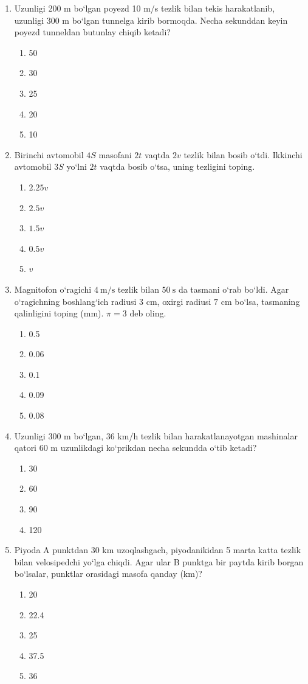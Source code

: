 \begin{enumerate}
\item Uzunligi 200 m bo‘lgan poyezd 10 m/s tezlik bilan tekis harakatlanib, uzunligi 300 m bo‘lgan tunnelga kirib bormoqda. 
Necha sekunddan keyin poyezd tunneldan butunlay chiqib ketadi?
\begin{enumerate}[label=\Alph*)]
\item 50
\item 30
\item 25
\item 20
\item 10
\end{enumerate}

\item Birinchi avtomobil $4S$ masofani $2t$ vaqtda $2v$ tezlik bilan bosib o‘tdi. 
Ikkinchi avtomobil $3S$ yo‘lni $2t$ vaqtda bosib o‘tsa, uning tezligini toping.
\begin{enumerate}[label=\Alph*)]
\item $2.25v$
\item $2.5v$
\item $1.5v$
\item $0.5v$
\item $v$
\end{enumerate}

\item Magnitofon o‘ragichi $4\ \text{m/s}$ tezlik bilan $50\ \text{s}$ da tasmani o‘rab bo‘ldi. 
Agar o‘ragichning boshlang‘ich radiusi $3$ cm, oxirgi radiusi $7$ cm bo‘lsa, tasmaning qalinligini toping (mm). 
$\pi=3$ deb oling.
\begin{enumerate}[label=\Alph*)]
\item 0.5
\item 0.06
\item 0.1
\item 0.09
\item 0.08
\end{enumerate}

\item Uzunligi 300 m bo‘lgan, 36 km/h tezlik bilan harakatlanayotgan mashinalar qatori 60 m uzunlikdagi ko‘prikdan necha sekundda o‘tib ketadi?
\begin{enumerate}[label=\Alph*)]
\item 30
\item 60
\item 90
\item 120
\end{enumerate}

\item Piyoda A punktdan 30 km uzoqlashgach, piyodanikidan 5 marta katta tezlik bilan velosipedchi yo‘lga chiqdi. 
Agar ular B punktga bir paytda kirib borgan bo‘lsalar, punktlar orasidagi masofa qanday (km)?
\begin{enumerate}[label=\Alph*)]
\item 20
\item 22.4
\item 25
\item 37.5
\item 36
\end{enumerate}


\end{enumerate}
